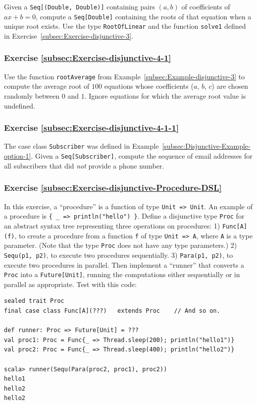 Given a \lstinline!Seq[(Double, Double)]! containing pairs $\left(a,b\right)$
of  coefficients of $ax+b=0$, compute a \lstinline!Seq[Double]!
containing the roots of that equation when a unique root exists. Use
the type \lstinline!RootOfLinear! and the function \lstinline!solve1!
defined in Exercise~\ref{subsec:Exercise-disjunctive-3}.

\subsubsection{Exercise \label{subsec:Exercise-disjunctive-4-1}\ref{subsec:Exercise-disjunctive-4-1}}

Use the function \lstinline!rootAverage! from Example~\ref{subsec:Example-disjunctive-3}
to compute the average root of $100$ equations whose coefficients
($a$, $b$, $c$) are chosen randomly between $0$ and $1$. Ignore
equations for which the average root value is undefined.

\subsubsection{Exercise \label{subsec:Exercise-disjunctive-4-1-1}\ref{subsec:Exercise-disjunctive-4-1-1}}

The case class \lstinline!Subscriber! was defined in Example~\ref{subsec:Disjunctive-Example-option-1}.
Given a \lstinline!Seq[Subscriber]!, compute the sequence of email
addresses for all subscribers that did \emph{not} provide a phone
number.

\subsubsection{Exercise \label{subsec:Exercise-disjunctive-Procedure-DSL}\ref{subsec:Exercise-disjunctive-Procedure-DSL}}

In this exercise, a \textsf{``}procedure\textsf{''} is a function
of type \lstinline!Unit => Unit!. An example of a procedure is \lstinline!{ _ => println("hello") }!.
Define a disjunctive type \lstinline!Proc! for an abstract syntax
tree representing three operations on procedures: 1) \lstinline!Func[A](f)!,
to create a procedure from a function \lstinline!f! of type \lstinline!Unit => A!,
where \lstinline!A! is a type parameter. (Note that the type \lstinline!Proc!
does not have any type parameters.) 2) \lstinline!Sequ(p1, p2)!,
to execute two procedures sequentially. 3) \lstinline!Para(p1, p2)!,
to execute two procedures in parallel. Then implement a \textsf{``}runner\textsf{''}
that converts a \lstinline!Proc! into a \lstinline!Future[Unit]!,
running the computations either sequentially or in parallel as appropriate.
Test with this code:
\begin{lstlisting}
sealed trait Proc
final case class Func[A](???)   extends Proc    // And so on.

def runner: Proc => Future[Unit] = ???
val proc1: Proc = Func{_ => Thread.sleep(200); println("hello1")}
val proc2: Proc = Func{_ => Thread.sleep(400); println("hello2")}

scala> runner(Sequ(Para(proc2, proc1), proc2))
hello1
hello2
hello2
\end{lstlisting}


